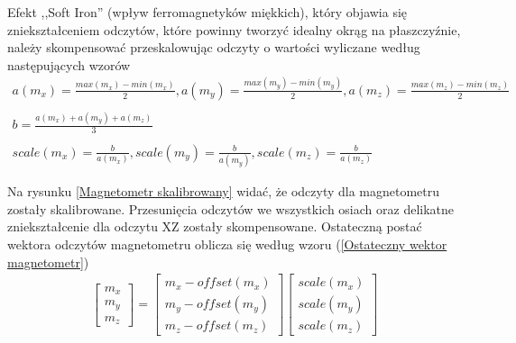 Efekt ,,Soft Iron'' (wpływ ferromagnetyków miękkich), który objawia się zniekształceniem odczytów, które powinny tworzyć idealny okrąg na płaszczyźnie, należy skompensować przeskalowując odczyty o wartości wyliczane według następujących wzorów
$$
    \begin{array}{c}
        a(m_x) = \frac{max(m_x) - min(m_x)}{2}, a(m_y) = \frac{max(m_y) - min(m_y)}{2}, a(m_z) = \frac{max(m_z) - min(m_z)}{2} \\ \\
        b = \frac{a(m_x) + a(m_y) + a(m_z)}{3} \\ \\
        scale(m_x) = \frac{b}{a(m_x)}, scale(m_y) = \frac{b}{a(m_y)}, scale(m_z) = \frac{b}{a(m_z)} 
    \end{array}
$$

Na rysunku \ref{Magnetometr skalibrowany} widać, że odczyty dla magnetometru zostały skalibrowane. Przesunięcia odczytów we wszystkich osiach oraz delikatne zniekształcenie dla odczytu XZ zostały skompensowane. Ostateczną postać wektora odczytów magnetometru oblicza się według wzoru (\ref{Ostateczny wektor magnetometr})
\begin{equation}
    \begin{array}{c}
        \left[
            \begin{array}{c}
                m_x \\
                m_y \\
                m_z
            \end{array}
        \right]
        =
        \left[
            \begin{array}{c}
                m_x - offset(m_x) \\
                m_y - offset(m_y) \\
                m_z - offset(m_z)
            \end{array}
        \right]
        \left[
            \begin{array}{c}
                scale(m_x) \\
                scale(m_y) \\
                scale(m_z)
            \end{array}
        \right]
    \end{array}
    \label{Ostateczny wektor magnetometr}
\end{equation}

